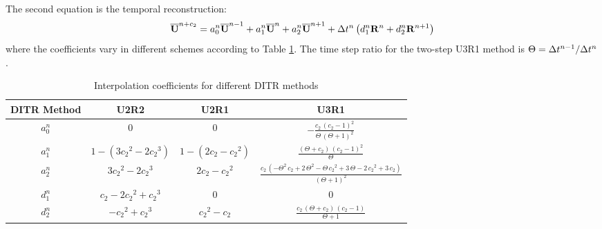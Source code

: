 The second equation is the temporal reconstruction:
\begin{equation}
    \label{eq:TRSum}
    \overline{\mathbf{U}}^{n+c_2}  =
    a^n_0\overline{\mathbf{U}}^{n - 1} +
    a^n_1\overline{\mathbf{U}}^{n} +
    a^n_2\overline{\mathbf{U}}^{n + 1}
    +
    \mathrm\Delta t^n
    \left(
    d^n_1\mathbf{R}^{n} +
    d^n_2\mathbf{R}^{n + 1}
    \right)
\end{equation}
where the coefficients vary in different schemes
according to Table \ref{tab:inter0Tab}.
The time step ratio for the two-step U3R1 method is
$\Theta = \mathrm\Delta t^{n-1} / \mathrm\Delta t^{n}$.

\begin{table}[htbp]
    \centering
    \footnotesize
    \begin{tabular}{|c|c|c|c|}
        \hline
        DITR Method & U2R2                          & U2R1                 & U3R1                                                                                                                                   \\
        \hline
        $a^n_0$     & 0                             & 0                    & $-\frac{c_{2}\,{\left(c_{2}-1\right)}^2}{\Theta\,{\left(\Theta+1\right)}^2}$                                                           \\
        \hline
        $a^n_1$     & $1-(3{c_2}^2 - 2 {c_2}^3)$    & $1-(2c_2 - {c_2}^2)$ & $\frac{\left(\Theta+c_{2}\right)\,{\left(c_{2}-1\right)}^2}{\Theta}$                                                                   \\
        \hline
        $a^n_2$     & $3{c_2}^2 - 2 {c_2}^3$        & $2c_2 - {c_2}^2$     & $\frac{c_{2}\,\left(-\Theta^2\,c_{2}+2\,\Theta^2-\Theta\,{c_{2}}^2+3\,\Theta-2\,{c_{2}}^2+3\,c_{2}\right)}{{\left(\Theta+1\right)}^2}$ \\
        \hline
        $d^n_1$     & ${c_2} - 2 {c_2}^2 + {c_2}^3$ & 0                    & 0                                                                                                                                      \\
        \hline
        $d^n_2$     & $- {c_2}^2 + {c_2}^3$         & ${c_2}^2 - {c_2}$    & $\frac{c_{2}\,\left(\Theta+c_{2}\right)\,\left(c_{2}-1\right)}{\Theta+1}$                                                              \\
        \hline
    \end{tabular}
    \caption{Interpolation coefficients for different DITR methods}
    \label{tab:inter0Tab}
\end{table}

